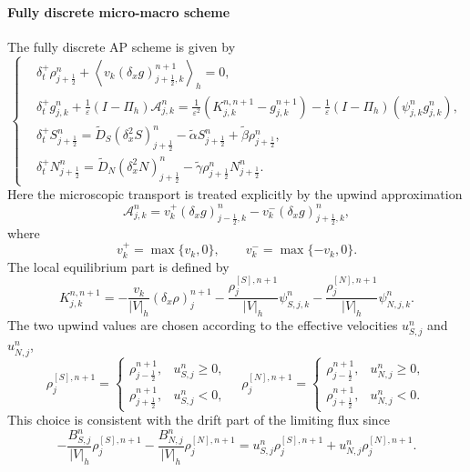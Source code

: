 \documentclass[11pt,twoside]{article}
\theoremstyle{plain}
\theoremstyle{nonumberplain}
\begin{document}
{\paragraph{Fully discrete micro-macro scheme}
The fully discrete AP scheme is given by
\begin{equation}\label{eq:modified-main-scheme}
\left\{
\begin{aligned}
&
\delta_t^+\rho_{j+\frac12}^n
+
\left\langle
v_k(\delta_x g)_{j+\frac12,k}^{n+1}
\right\rangle_h
=0,
\\[1mm]
&
\delta_t^+ g_{j,k}^n
+
\frac1\varepsilon
(I-\Pi_h)\mathcal A_{j,k}^n
=
\frac1{\varepsilon^2}
\left(
K_{j,k}^{n,n+1}
-
g_{j,k}^{n+1}
\right)
-
\frac1\varepsilon
(I-\Pi_h)(\psi_{j,k}^n g_{j,k}^n),
\\[1mm]
&
\delta_t^+S_{j+\frac12}^{n}
=
\widetilde D_S(\delta_x^2S)_{j+\frac12}^{n}
-\widetilde\alpha S_{j+\frac12}^{n}
+\widetilde\beta\rho_{j+\frac12}^{n},
\\[1mm]
&
\delta_t^+N_{j+\frac12}^{n}
=
\widetilde D_N(\delta_x^2N)_{j+\frac12}^{n}
-\widetilde\gamma\rho_{j+\frac12}^{n}N_{j+\frac12}^{n}.
\end{aligned}
\right.
\end{equation}
Here the microscopic transport is treated explicitly by the upwind
approximation
\[
\mathcal A_{j,k}^n
=
v_k^+(\delta_x g)_{j-\frac12,k}^{n}
-
v_k^-(\delta_x g)_{j+\frac12,k}^{n},
\]
where
\[
v_k^+=\max\{v_k,0\},
\qquad
v_k^-=\max\{-v_k,0\}.
\]
The local equilibrium part is defined by
\begin{equation}\label{eq:modified-K-two-upwind}
K_{j,k}^{n,n+1}
=
-\frac{v_k}{|V|_h}(\delta_x\rho)_j^{n+1}
-
\frac{\rho_j^{[S],n+1}}{|V|_h}\psi_{S,j,k}^n
-
\frac{\rho_j^{[N],n+1}}{|V|_h}\psi_{N,j,k}^n .
\end{equation}
The two upwind values are chosen according to the effective velocities
\(u_{S,j}^n\) and \(u_{N,j}^n\),
\[
\rho_j^{[S],n+1}
=
\begin{cases}
\rho_{j-\frac12}^{n+1}, & u_{S,j}^n\ge 0,\\
\rho_{j+\frac12}^{n+1}, & u_{S,j}^n<0,
\end{cases}
\quad 
\rho_j^{[N],n+1}
=
\begin{cases}
\rho_{j-\frac12}^{n+1}, & u_{N,j}^n\ge 0,\\
\rho_{j+\frac12}^{n+1}, & u_{N,j}^n<0.
\end{cases}
\]
This choice is consistent with the drift part of the limiting flux since
\[
-\frac{B_{S,j}^n}{|V|_h}\rho_j^{[S],n+1}
-
\frac{B_{N,j}^n}{|V|_h}\rho_j^{[N],n+1}
=
u_{S,j}^n\rho_j^{[S],n+1}
+
u_{N,j}^n\rho_j^{[N],n+1}.
\]

}
\end{document}
